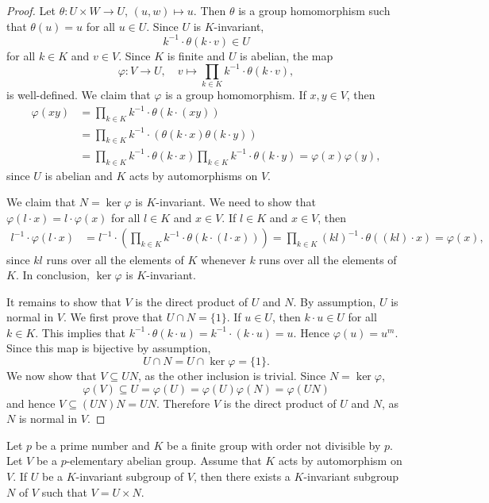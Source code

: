 \begin{proof}
Let $\theta\colon U\times W\to U$, $(u,w)\mapsto u$. Then $\theta$ is a group homomorphism such that 
$\theta(u)=u$ for all $u\in U$. Since $U$ is $K$-invariant, 
\[
k^{-1}\cdot \theta(k\cdot v)\in U
\]
for all $k\in K$ and $v\in V$. 
Since $K$ is finite and $U$ is abelian, 
the map 
\[
\varphi\colon V\to U,\quad 
v\mapsto \prod_{k\in K}k^{-1}\cdot \theta(k\cdot v), 
\]
is well-defined. 
We claim that $\varphi$ is a group homomorphism. If $x,y\in V$, then 
\begin{align*}
    \varphi(xy) &= \prod_{k\in K}k^{-1}\cdot \theta(k\cdot (xy))\\
    &= \prod_{k\in K}k^{-1}\cdot (\theta(k\cdot x)\theta(k\cdot y))\\
    &= \prod_{k\in K}k^{-1}\cdot \theta(k\cdot x) \prod_{k\in K}k^{-1}\cdot \theta(k\cdot y)=\varphi(x)\varphi(y),
\end{align*}
since $U$ is abelian and $K$ acts by automorphisms on $V$. 

We claim that $N=\ker\varphi$ is $K$-invariant. 
We need to show that $\varphi(l\cdot x)=l\cdot\varphi(x)$ for all $l\in K$ and $x\in V$. 
If $l\in K$ and $x\in V$, then 
\begin{align*}
l^{-1}\cdot\varphi(l\cdot x)&=l^{-1}\cdot\left(\prod_{k\in K}k^{-1}\cdot \theta(k\cdot (l\cdot x))\right)=\prod_{k\in K}(kl)^{-1}\cdot\theta( (kl)\cdot x)=\varphi(x),
\end{align*}
since $kl$ runs over all the elements of $K$ whenever $k$ runs over all the elements of $K$.
In conclusion, $\ker\varphi$ is $K$-invariant. 

It remains to show that $V$ is the direct product of $U$ and $N$. By assumption, $U$ is normal in $V$. 
We first prove that $U\cap N=\{1\}$. If $u\in U$, then $k\cdot u\in U$ for all $k\in K$. This implies that 
$k^{-1}\cdot\theta(k\cdot u)=k^{-1}\cdot (k\cdot u)=u$. Hence $\varphi(u)=u^m$. Since this map is bijective by assumption,  
\[
U\cap N=U\cap\ker\varphi=\{1\}.
\]
We now show that $V\subseteq UN$, as the other inclusion is trivial. Since $N=\ker\varphi$,  
\[
\varphi(V)\subseteq U=\varphi(U)=\varphi(U)\varphi(N)=\varphi(UN) 
\]
and hence $V\subseteq (UN)N=UN$. 
Therefore $V$ is the direct product of $U$ and $N$, as $N$ is normal in $V$.
\end{proof}

\begin{corollary}
    Let $p$ be a prime number and $K$ be a finite
    group with order not divisible by $p$. Let $V$ be
    a $p$-elementary abelian group. Assume that $K$ acts
    by automorphism on $V$. If $U$ be a $K$-invariant subgroup of $V$, 
    then there exists a $K$-invariant subgroup $N$ of $V$ 
    such that $V=U\times N$. 
\end{corollary}

